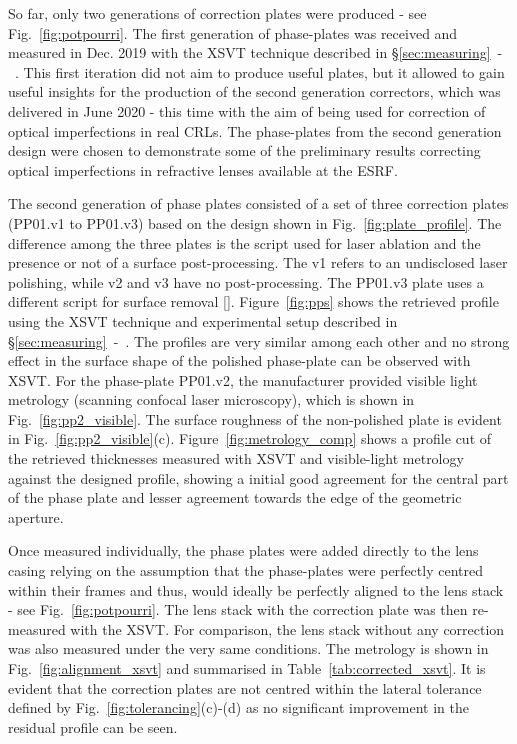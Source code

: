 \begin{refsection}
So far, only two generations of correction plates were produced - see Fig.~\ref{fig:potpourri}. The first generation of phase-plates was received and measured in Dec. 2019 with the XSVT technique described in \S\ref{sec:measuring}~-~\textit{}. This first iteration did not aim to produce useful plates, but it allowed to gain useful insights for the production of the second generation correctors, which was delivered in June 2020 - this time with the aim of being used for correction of optical imperfections in real CRLs. The phase-plates from the second generation design were chosen to demonstrate some of the preliminary results correcting optical imperfections in refractive lenses available at the ESRF.

The second generation of phase plates consisted of a set of three correction plates (PP01.v1 to PP01.v3) based on the design shown in Fig.~\ref{fig:plate_profile}. The difference among the three plates is the script used for laser ablation and the presence or not of a surface post-processing. The v1 refers to an undisclosed laser polishing, while v2 and v3 have no post-processing. The PP01.v3 plate uses a different script for surface removal [\cite{Antipov2020}]. Figure~\ref{fig:pps} shows the retrieved profile using the XSVT technique and experimental setup described in \S\ref{sec:measuring}~-~\textit{}. The profiles are very similar among each other and no strong effect in the surface shape of the polished phase-plate can be observed with XSVT. For the phase-plate PP01.v2, the manufacturer provided visible light metrology (scanning confocal laser microscopy), which is shown in Fig.~\ref{fig:pp2_visible}. The surface roughness of the non-polished plate is evident in Fig.~\ref{fig:pp2_visible}(c). Figure~\ref{fig:metrology_comp} shows a profile cut of the retrieved thicknesses measured with XSVT and visible-light metrology against the designed profile, showing a initial good agreement for the central part of the phase plate and lesser agreement towards the edge of the geometric aperture.  

Once measured individually, the phase plates were added directly to the lens casing relying on the assumption that the phase-plates were perfectly centred within their frames and thus, would ideally be perfectly aligned to the lens stack - see Fig.~\ref{fig:potpourri}. The lens stack with the correction plate was then re-measured with the XSVT. For comparison, the lens stack without any correction was also measured under the very same conditions. The metrology is shown in Fig.~\ref{fig:alignment_xsvt} and summarised in Table~\ref{tab:corrected_xsvt}. It is evident that the correction plates are not centred within the lateral tolerance defined by Fig.~\ref{fig:tolerancing}(c)-(d) as no significant improvement in the residual profile can be seen.


\end{refsection}
